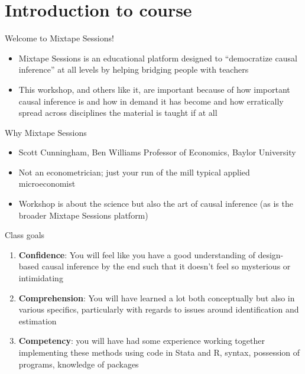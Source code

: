\documentclass{beamer}
\begin{document}




\section{Introduction to course}

\begin{frame}{Welcome to Mixtape Sessions!}

  \begin{itemize}
    \item Mixtape Sessions is an educational platform designed to ``democratize causal inference'' at all levels by helping bridging people with teachers
    \item This workshop, and others like it, are important because of how important causal inference is and how in demand it has become and how erratically spread across disciplines the material is taught if at all
  \end{itemize}

\end{frame}

\begin{frame}{Why Mixtape Sessions}

  \begin{itemize}

    \item Scott Cunningham, Ben Williams Professor of Economics, Baylor University 
    \item Not an econometrician; just your run of the mill typical applied microeconomist
    \item Workshop is about the science but also the art of causal inference (as is the broader Mixtape Sessions platform)

  \end{itemize}

\end{frame}

\begin{frame}{Class goals}

  \begin{enumerate}
    \item \textbf{Confidence}: You will feel like you have a good understanding of design-based causal inference by the end such that it doesn't feel so mysterious or intimidating
    \item \textbf{Comprehension}: You will have learned a lot both conceptually but also in various specifics, particularly with regards to issues around identification and estimation
    \item \textbf{Competency}: you will have had some experience working together implementing these methods using code in Stata and R, syntax, possession of programs, knowledge of packages
  \end{enumerate}

\end{frame}
\end{document}
